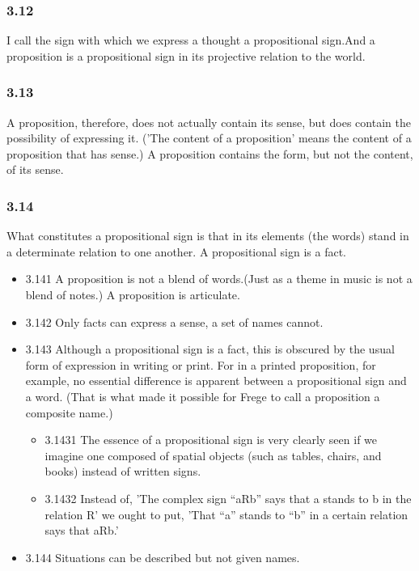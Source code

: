 \documentclass[11pt]{article}
\begin{document}
\subsubsection*{3.12}
\label{sec:org9768576}
I call the sign with which we express a thought a propositional
sign.And a proposition is a propositional sign in its projective relation
to the world.
\subsubsection*{3.13}
\label{sec:org224ea6c}
A proposition, therefore, does not actually contain its sense, but
does contain the possibility of expressing it. ('The content of a
proposition' means the content of a proposition that has sense.) A
proposition contains the form, but not the content, of its sense.
\subsubsection*{3.14}
\label{sec:org8898d8f}
What constitutes a propositional sign is that in its elements (the
words) stand in a determinate relation to one another. A propositional sign
is a fact.
\begin{itemize}
\item 3.141
\label{sec:org9b3e6d9}
A proposition is not a blend of words.(Just as a theme in music is
not a blend of notes.) A proposition is articulate.
\item 3.142
\label{sec:org1b2440c}
Only facts can express a sense, a set of names cannot.
\item 3.143
\label{sec:org5c6e845}
Although a propositional sign is a fact, this is obscured by the
usual form of expression in writing or print. For in a printed proposition,
for example, no essential difference is apparent between a propositional
sign and a word. (That is what made it possible for Frege to call a
proposition a composite name.)
\begin{itemize}
\item 3.1431
\label{sec:org6247bc7}
The essence of a propositional sign is very clearly seen if we
imagine one composed of spatial objects (such as tables, chairs, and books)
instead of written signs.
\item 3.1432
\label{sec:org86553b2}
Instead of, 'The complex sign ``aRb'' says that a stands to b in the
relation R' we ought to put, 'That ``a'' stands to ``b'' in a certain relation
says that aRb.'
\end{itemize}
\item 3.144
\label{sec:org2539195}
Situations can be described but not given names.
\end{itemize}
\end{document}
